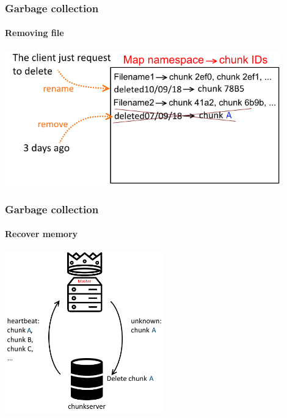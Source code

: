 \documentclass{beamer}
\newcommand{\slideheight}{7cm}
\newcommand{\slidewidth}{12cm}
\begin{document}
\begin{frame}
 \frametitle{Garbage collection}
 \framesubtitle{Removing file}
 \centering
 \includegraphics[width=\slidewidth]{figures/removeschema.png}
\end{frame}

\begin{frame}
 \frametitle{Garbage collection}
 \framesubtitle{Recover memory}
 \centering
 \includegraphics[height=\slideheight]{figures/recoverymemoryschema.png}
\end{frame}
\end{document}
